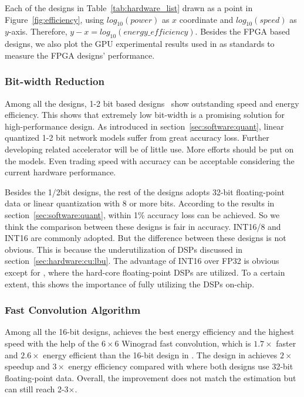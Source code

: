 Each of the designs in Table~\ref{tab:hardware_list} drawn as a point in Figure~\ref{fig:efficiency}, using $log_{10}(power)$ as $x$ coordinate and $log_{10}(speed)$ as $y$-axis. Therefore, $y-x=log_{10}(energy\_efficiency)$. Besides the FPGA based designs, we also plot the GPU experimental results used in \cite{guo2017angel, han2017ese} as standards to measure the FPGA designs' performance.

\subsubsection*{\textbf{Bit-width Reduction}} Among all the designs, 1-2 bit based designs~\cite{jiao2017accelerating, moss2017high, nakahara2017fully} show outstanding speed and energy efficiency. This shows that extremely low bit-width is a promising solution for high-performance design. As introduced in section~\ref{sec:software:quant}, linear quantized 1-2 bit network models suffer from great accuracy loss. Further developing related accelerator will be of little use. More efforts should be put on the models. Even trading speed with accuracy can be acceptable considering the current hardware performance.

Besides the 1/2bit designs, the rest of the designs adopts 32-bit floating-point data or linear quantization with 8 or more bits. According to the results in section~\ref{sec:software:quant}, within 1\% accuracy loss can be achieved. So we think the comparison between these designs is fair in accuracy. INT16/8 and INT16 are commonly adopted. But the difference between these designs is not obvious. This is because the underutilization of DSPs discussed in section~\ref{sec:hardware:cu:lbu}. The advantage of INT16 over FP32 is obvious except for \cite{zhang2017improving}, where the hard-core floating-point DSPs are utilized. To a certain extent, this shows the importance of fully utilizing the DSPs on-chip.

\subsubsection*{\textbf{Fast Convolution Algorithm}} Among all the 16-bit designs, \cite{lu2017evaluating} achieves the best energy efficiency and the highest speed with the help of the $6\times 6$ Winograd fast convolution, which is $1.7\times$ faster and $2.6\times$ energy efficient than the 16-bit design in \cite{zhang2017improving}. The design in \cite{zhang2017frequency} achieves $2\times$ speedup and $3\times$ energy efficiency compared with \cite{zhang2015optimizing} where both designs use 32-bit floating-point data. Overall, the improvement does not match the estimation but can still reach 2-3$\times$.

